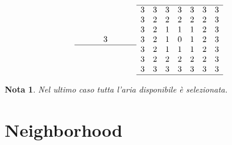 \documentclass{report}
\newtheorem{nota}{Nota}[section]
\begin{document}
\begin{itemize}
\begin{itemize}
\begin{eqnarray*}
\begin{array}[ht!]{ccccccc}
                      &&&3&&&\\\hline
                    \end{array} & \begin{array}[ht!]{ccccccc}
                      \hline
                      3 & 3 & 3 & 3 & 3 & 3 & 3\\
                      3 & 2 & 2 & 2 & 2 & 2 & 3\\
                      3 & 2 & 1 & 1 & 1 & 2 & 3\\
                      3 & 2 & 1 & 0 & 1 & 2 & 3\\
                      3 & 2 & 1 & 1 & 1 & 2 & 3\\
                      3 & 2 & 2 & 2 & 2 & 2 & 3\\
                      3 & 3 & 3 & 3 & 3 & 3 & 3\\\hline
                    \end{array}
    \end{eqnarray*}
  \end{itemize}
\end{itemize}
\begin{nota}
  Nel ultimo caso tutta l'aria disponibile è selezionata.
\end{nota}

\section{Neighborhood}
\label{sec:neiborhood}
\end{document}
